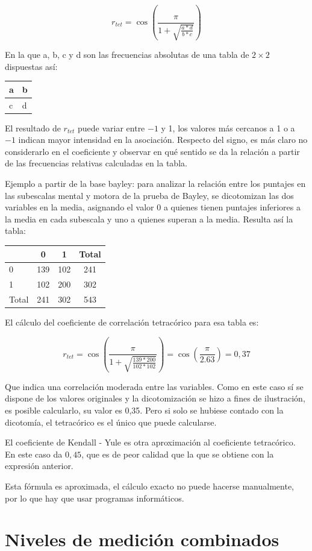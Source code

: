 \documentclass[]{book}
\begin{document}
\[r_{tet} = \cos(\frac{\pi}{1 + \sqrt{\frac{a*d}{b*c}}})\]

En la que a, b, c y d son las frecuencias absolutas de una tabla de \(2 \times 2\)
dispuestas así:

\begin{longtable}[]{@{}ll@{}}
\toprule
a & b\tabularnewline
\midrule
\endhead
c & d\tabularnewline
\bottomrule
\end{longtable}

El resultado de \(r_{tet}\) puede variar entre \(-1\) y 1, los valores
más cercanos a 1 o a \(-1\) indican mayor intensidad en la asociación.
Respecto del signo, es más claro no considerarlo en el coeficiente y
observar en qué sentido se da la relación a partir de las frecuencias
relativas calculadas en la tabla.

Ejemplo a partir de la base bayley: para analizar la relación entre los puntajes en las subescalas mental y motora de la prueba de Bayley, se dicotomizan
las dos variables en la media, asignando el valor 0 a quienes tienen
puntajes inferiores a la media en cada subescala y uno a quienes superan a la media. Resulta así la tabla:

\begin{longtable}[]{@{}lccc@{}}
\toprule
& 0 & 1 & Total\tabularnewline
\midrule
\endhead
0 & 139 & 102 & 241\tabularnewline
1 & 102 & 200 & 302\tabularnewline
Total & 241 & 302 & 543\tabularnewline
\bottomrule
\end{longtable}

El cálculo del coeficiente de correlación tetracórico para esa tabla es:

\[r_{tet} = \cos(\frac{\pi}{1 + \sqrt{\frac{139*200}{102*102}}}) = \cos{(\frac{\pi}{2.63}) = 0,37}\]

Que indica una correlación moderada entre las variables. Como en este
caso sí se dispone de los valores originales y la dicotomización se hizo a fines de ilustración, es posible calcularlo, su valor es 0,35. Pero si solo se hubiese contado con la dicotomía, el tetracórico es el único que puede calcularse.

El coeficiente de Kendall - Yule es otra aproximación al coeficiente
tetracórico. En este caso da \(0,45\), que es de peor calidad que la que se obtiene con la expresión anterior.

Esta fórmula es aproximada, el cálculo exacto no puede hacerse
manualmente, por lo que hay que usar programas informáticos.

\hypertarget{niveles-de-medicion-combinados}{%
\section{Niveles de medición combinados}\label{niveles-de-medicion-combinados}}
\end{document}
